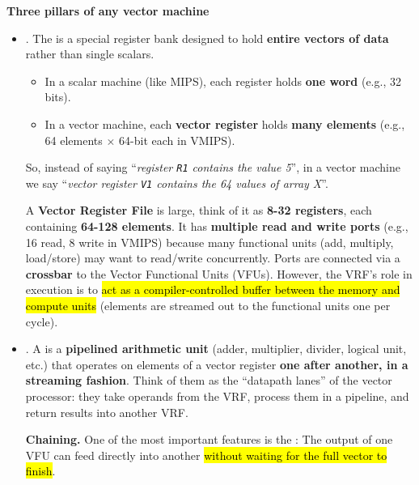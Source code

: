 \highspace
\begin{flushleft}
    \textcolor{Green3}{ \textbf{Three pillars of any vector machine}}
\end{flushleft}
\begin{itemize}
    \item {}. The  is a special register bank designed to hold \textbf{entire vectors of data} rather than single scalars.
    \begin{itemize}
        \item In a scalar machine (like MIPS), each register holds \textbf{one word} (e.g., 32 bits).
        \item In a vector machine, each \textbf{vector register} holds \textbf{many elements} (e.g., 64 elements $\times$ 64-bit each in VMIPS).
    \end{itemize}
    So, instead of saying ``\emph{register \texttt{R1} contains the value 5}'', in a vector machine we say ``\emph{vector register \texttt{V1} contains the 64 values of array X}''.

    \highspace
    A \textbf{Vector Register File} is large, think of it as \textbf{8-32 registers}, each containing \textbf{64-128 elements}. It has \textbf{multiple read and write ports} (e.g., 16 read, 8 write in VMIPS) because many functional units (add, multiply, load/store) may want to read/write concurrently. Ports are connected via a \textbf{crossbar} to the Vector Functional Units (VFUs). However, the VRF's role in execution is to \hl{act as a compiler-controlled buffer between the memory and compute units} (elements are streamed out to the functional units one per cycle).


    \item {}. A  is a \textbf{pipelined arithmetic unit} (adder, multiplier, divider, logical unit, etc.) that operates on elements of a vector register \textbf{one after another, in a streaming fashion}. Think of them as the ``datapath lanes'' of the vector processor: they take operands from the VRF, process them in a pipeline, and return results into another VRF.

    \highspace
    \textcolor{Green3}{\faIcon{\speedIcon} \textbf{Chaining.}} One of the most important features is the : The output of one VFU can feed directly into another \hl{without waiting for the full vector to finish}.



\end{itemize}
